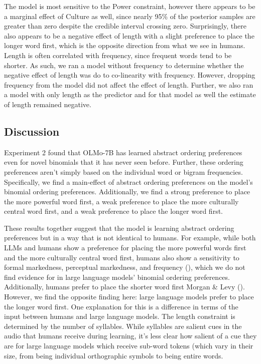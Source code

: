 \documentclass[
  12pt,
  letterpaper,
]{scrreprt}
\begin{document}
The model is most sensitive to the Power constraint, however there
appears to be a marginal effect of Culture as well, since nearly 95\% of
the posterior samples are greater than zero despite the credible
interval crossing zero. Surprisingly, there also appears to be a
negative effect of length with a slight preference to place the longer
word first, which is the opposite direction from what we see in humans.
Length is often correlated with frequency, since frequent words tend to
be shorter. As such, we ran a model without frequency to determine
whether the negative effect of length was do to co-linearity with
frequency. However, dropping frequency from the model did not affect the
effect of length. Further, we also ran a model with only length as the
predictor and for that model as well the estimate of length remained
negative.

\subsection{Discussion}\label{discussion-6}

Experiment 2 found that OLMo-7B has learned abstract ordering
preferences even for novel binomials that it has never seen before.
Further, these ordering preferences aren't simply based on the
individual word or bigram frequencies. Specifically, we find a
main-effect of abstract ordering preferences on the model's binomial
ordering preferences. Additionally, we find a strong preference to place
the more powerful word first, a weak preference to place the more
culturally central word first, and a weak preference to place the longer
word first.

These results together suggest that the model is learning abstract
ordering preferences but in a way that is not identical to humans. For
example, while both LLMs and humans show a preference for placing the
more powerful words first and the more culturally central word first,
humans also show a sensitivity to formal markedness, perceptual
markedness, and frequency
(), which we do not find evidence for in large language models'
binomial ordering preferences. Additionally, humans prefer to place the
shorter word first Morgan \& Levy ().
However, we find the opposite finding here: large language models prefer
to place the longer word first. One explanation for this is a difference
in terms of the input between humans and large language models. The
length constraint is determined by the number of syllables. While
syllables are salient cues in the audio that humans receive during
learning, it's less clear how salient of a cue they are for large
language models which receive sub-word tokens (which vary in their size,
from being individual orthographic symbols to being entire words.
\end{document}

